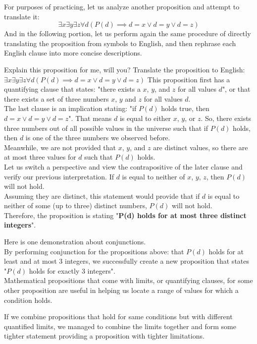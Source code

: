 For purposes of practicing, let us analyze another proposition and attempt to translate it:
\[\exists x \exists y \exists z \forall d (P(d) \implies d = x \lor d = y \lor d = z)\]
And in the following portion, let us perform again the same procedure of directly translating the proposition from symbols to English, and then rephrase each English clause into more concise descriptions.
\begin{ln-think}{Explain this proposition for me, will you?}{}
    Translate the proposition to English: $\exists x \exists y \exists z \forall d (P(d) \implies d = x \lor d = y \lor d = z)$
    \tcblower
    This proposition first has a quantifying clause that states: "there exists a $x$, $y$, and $z$ for all values $d$", or that there exists a set of three numbers $x$, $y$ and $z$ for all values $d$. \\
    The last clause is an implication stating: "if $P(d)$ holds true, then $d = x \lor d = y \lor d = z$". That means $d$ is equal to either $x$, $y$, or $z$. So, there exists three numbers out of all possible values in the universe such that if $P(d)$ holds, then $d$ is one of the three numbers we observed before. \\
    Meanwhile, we are not provided that $x$, $y$, and $z$ are distinct values, so there are at most three values for $d$ such that $P(d)$ holds.\\
    Let us switch a perspective and view the contrapositive of the later clause and verify our previous interpretation. If $d$ is equal to neither of $x$, $y$, $z$, then $P(d)$ will not hold. \\
    Assuming they are distinct, this statement would provide that if $d$ is equal to neither of some (up to three) distinct numbers, $P(d)$ will not hold. \\
    Therefore, the proposition is stating "\textbf{P(d) holds for at most three distinct integers}".
\end{ln-think}
Here is one demonstration about conjunctions. \\
By performing conjunction for the propositions above: that $P(d)$ holds for at least and at most 3 integers, we successfully create a new proposition that states "$P(d)$ holds for exactly 3 integers". \\
Mathematical propositions that come with limits, or quantifying clauses, for some other proposition are useful in helping us locate a range of values for which a condition holds. 

If we combine propositions that hold for same conditions but with different quantified limits, we managed to combine the limits together and form some tighter statement providing a proposition with tighter limitations.

